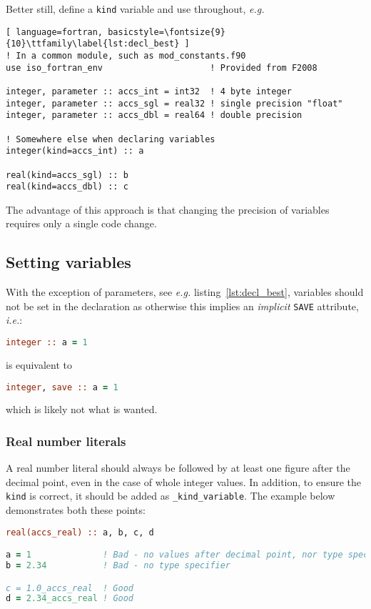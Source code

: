 \documentclass[11pt]{report}
\begin{document}
Better still, define a \texttt{kind} variable and use throughout, \textit{e.g.}
\begin{lstlisting}[ language=fortran, basicstyle=\fontsize{9}{10}\ttfamily\label{lst:decl_best} ]
! In a common module, such as mod_constants.f90
use iso_fortran_env                     ! Provided from F2008

integer, parameter :: accs_int = int32  ! 4 byte integer
integer, parameter :: accs_sgl = real32 ! single precision "float"
integer, parameter :: accs_dbl = real64 ! double precision

! Somewhere else when declaring variables
integer(kind=accs_int) :: a

real(kind=accs_sgl) :: b
real(kind=accs_dbl) :: c
\end{lstlisting}
The advantage of this approach is that changing the precision of variables requires only a single code
change.

\subsection{Setting variables}

With the exception of parameters, see \textit{e.g.} listing~\ref{lst:decl_best}, variables should
not be set in the declaration as otherwise this implies an \textit{implicit} \texttt{SAVE} attribute,
\textit{i.e.}:
\begin{lstlisting}[language=fortran, basicstyle=\fontsize{9}{10}\ttfamily]
integer :: a = 1
\end{lstlisting}
is equivalent to
\begin{lstlisting}[language=fortran, basicstyle=\fontsize{9}{10}\ttfamily]
integer, save :: a = 1
\end{lstlisting}
which is likely not what is wanted.

\subsubsection{Real number literals}

A real number literal should always be followed by at least one figure after the decimal point, even
in the case of whole integer values. In addition, to ensure the \texttt{kind} is correct, it should be added as \texttt{\_kind\_variable}. The example
below demonstrates both these points:

\begin{lstlisting}[language=fortran, basicstyle=\fontsize{9}{10}\ttfamily]
real(accs_real) :: a, b, c, d

a = 1              ! Bad - no values after decimal point, nor type specifier
b = 2.34           ! Bad - no type specifier

c = 1.0_accs_real  ! Good
d = 2.34_accs_real ! Good
\end{lstlisting}
\end{document}
